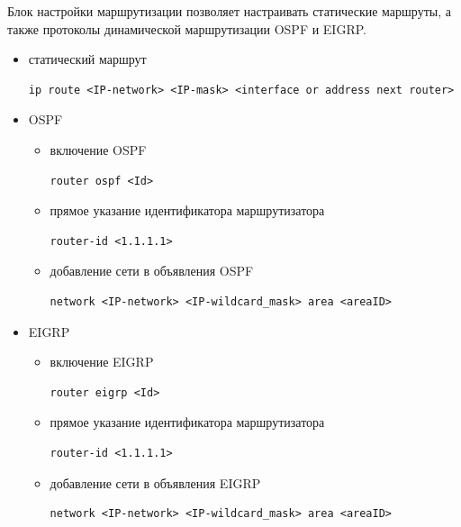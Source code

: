 Блок настройки маршрутизации позволяет настраивать статические маршруты, а также протоколы динамической маршрутизации OSPF и EIGRP.

\begin{itemize}
	\item статический маршрут
	\begin{lstlisting}
ip route <IP-network> <IP-mask> <interface or address next router>
	\end{lstlisting}
	
	\item OSPF
	
	\begin{itemize}
		\item включение OSPF
		
		\begin{lstlisting}
router ospf <Id>
		\end{lstlisting}
		
		\item прямое указание идентификатора маршрутизатора
		
\begin{lstlisting}
router-id <1.1.1.1>
\end{lstlisting}

\item добавление сети в объявления OSPF

\begin{lstlisting}
network <IP-network> <IP-wildcard_mask> area <areaID>
\end{lstlisting}
	\end{itemize}
		\item EIGRP
		
		\begin{itemize}
			\item включение EIGRP
			
			\begin{lstlisting}
router eigrp <Id>
			\end{lstlisting}
			
			\item прямое указание идентификатора маршрутизатора
			
			\begin{lstlisting}
router-id <1.1.1.1>
			\end{lstlisting}
			
			\item добавление сети в объявления EIGRP
			
			\begin{lstlisting}
network <IP-network> <IP-wildcard_mask> area <areaID>
			\end{lstlisting}
		\end{itemize}
\end{itemize}

